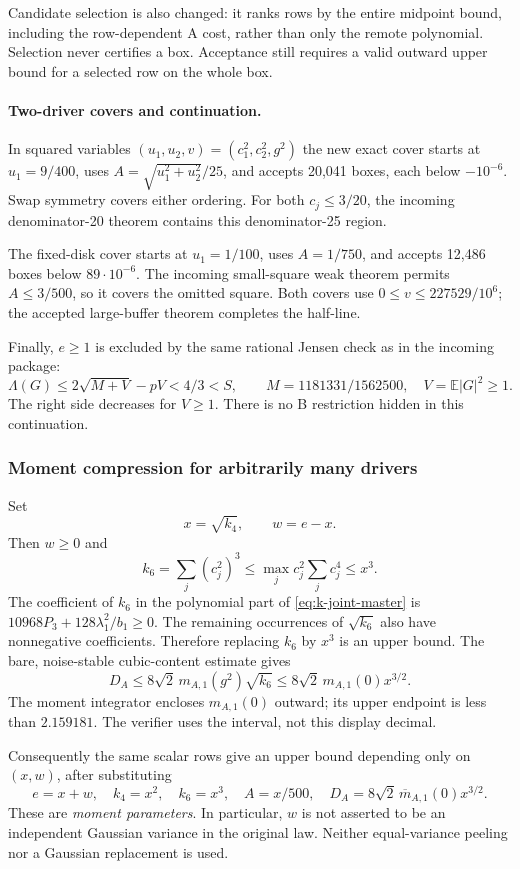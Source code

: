 Candidate selection is also changed: it ranks rows by the entire
midpoint bound, including the row-dependent A cost, rather than only
the remote polynomial. Selection never certifies a box. Acceptance
still requires a valid outward upper bound for a selected row on the
whole box.

\paragraph{Two-driver covers and continuation.}
In squared variables $(u_1,u_2,v)=(c_1^2,c_2^2,g^2)$ the new exact
cover starts at $u_1=9/400$, uses $A=\sqrt{u_1^2+u_2^2}/25$, and
accepts 20,041 boxes, each below $-10^{-6}$.
Swap symmetry covers either ordering. For both $c_j\le3/20$, the
incoming denominator-20 theorem contains this denominator-25 region.

The fixed-disk cover starts at $u_1=1/100$, uses $A=1/750$, and
accepts 12,486 boxes below $89\cdot10^{-6}$. The incoming small-square
weak theorem permits $A\le3/500$, so it covers the omitted square.
Both covers use $0\le v\le227529/10^6$; the accepted large-buffer
theorem completes the half-line.

Finally, $e\ge1$ is excluded by the same rational Jensen check as in
the incoming package:
\[
 \Lambda(G)\le2\sqrt{M+V}-pV<4/3<S,\qquad
 M=1181331/1562500,\quad V=\mathbb E|G|^2\ge1.
\]
The right side decreases for $V\ge1$. There is no B restriction hidden
in this continuation.

\subsubsection{Moment compression for arbitrarily many drivers}
Set
\[
 x=\sqrt{k_4},\qquad w=e-x.
\]
Then $w\ge0$ and
\[
 k_6=\sum_j(c_j^2)^3
       \le\max_jc_j^2\sum_jc_j^4\le x^3.
 \tag{M}
\]
The coefficient of $k_6$ in the polynomial part of
\eqref{eq:k-joint-master} is
$10968P_3+128\lambda_1^2/b_1\ge0$.
The remaining occurrences of $\sqrt{k_6}$ also have nonnegative
coefficients. Therefore replacing $k_6$ by $x^3$ is an upper bound.
The bare, noise-stable cubic-content estimate gives
\[
 D_A\le8\sqrt2\,m_{A,1}(g^2)\sqrt{k_6}
        \le8\sqrt2\,m_{A,1}(0)x^{3/2}.
 \tag{A}
\]
The moment integrator encloses $m_{A,1}(0)$ outward; its upper endpoint
is less than $2.159181$. The verifier uses the interval, not this
display decimal.

Consequently the same scalar rows give an upper bound depending only
on $(x,w)$, after substituting
\[
 e=x+w,\quad k_4=x^2,\quad k_6=x^3,\quad A=x/500,
 \quad D_A=8\sqrt2\,\overline m_{A,1}(0)x^{3/2}.
\]
These are \emph{moment parameters}. In particular, $w$ is not asserted
to be an independent Gaussian variance in the original law. Neither
equal-variance peeling nor a Gaussian replacement is used.

